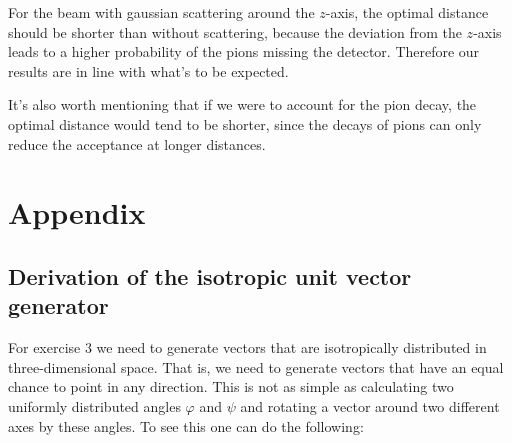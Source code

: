 \documentclass[12pt,a4paper,oneside,english]{article}
\begin{document}
For the beam with gaussian scattering around the $z$-axis, the optimal distance should be shorter than without scattering, because the deviation from the $z$-axis leads to a higher probability of the pions missing the detector. Therefore our results are in line with what's to be expected.

It’s also worth mentioning that if we were to account for the pion decay, the optimal distance would tend to be shorter, since the decays of pions can only reduce the acceptance at longer distances.

\appendix
\section{Appendix}
\subsection{Derivation of the isotropic unit vector generator}
\label{subsec: unit_vector}
For exercise 3 we need to generate vectors that are isotropically distributed in three-dimensional space. That is, we need to generate vectors that have an equal chance to point in any direction. This is not as simple as calculating two uniformly distributed angles $\varphi$ and $\psi$ and rotating a vector around two different axes by these angles. To see this one can do the following:
\end{document}
